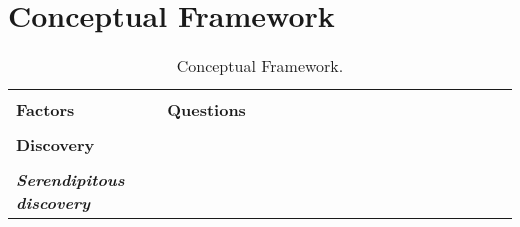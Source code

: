 \documentclass{casconpaper}
\begin{document}
{\section{Conceptual Framework}
\begin{table*}[htbp]
\caption{Conceptual Framework.}
\centering
\begin{tabular}{|p{0.30\linewidth}|p{0.70\linewidth}|}
\hline
&\\
\textbf{\large{Factors}}   & \textbf{\large{Questions}}  \\
\hline
&\\
\textbf{\large{Discovery}}                     &                                                                                                           \\
&\\
\emph{\textbf{Serendipitous discovery}}     &                                                                                                           \\


\end{tabular}
\end{table*}}
\end{document}
